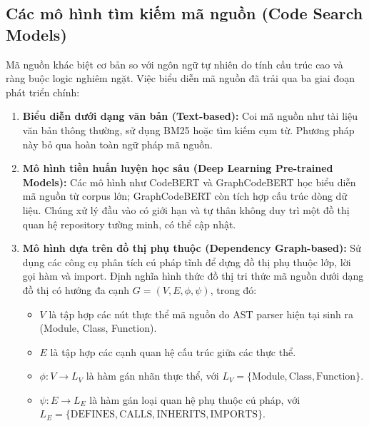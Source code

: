 \documentclass[12pt,a4paper,oneside]{report}
\begin{document}
\subsection{Các mô hình tìm kiếm mã nguồn (Code Search Models)}
Mã nguồn khác biệt cơ bản so với ngôn ngữ tự nhiên do tính cấu trúc cao và ràng buộc logic nghiêm ngặt. Việc biểu diễn mã nguồn đã trải qua ba giai đoạn phát triển chính:
\begin{enumerate}
    \item \textbf{Biểu diễn dưới dạng văn bản (Text-based):} Coi mã nguồn như tài liệu văn bản thông thường, sử dụng BM25 hoặc tìm kiếm cụm từ. Phương pháp này bỏ qua hoàn toàn ngữ pháp mã nguồn.
    \item \textbf{Mô hình tiền huấn luyện học sâu (Deep Learning Pre-trained Models):} Các mô hình như CodeBERT \cite{feng2020codebert} và GraphCodeBERT \cite{guo2024graphcodebert} học biểu diễn mã nguồn từ corpus lớn; GraphCodeBERT còn tích hợp cấu trúc dòng dữ liệu. Chúng xử lý đầu vào có giới hạn và tự thân không duy trì một đồ thị quan hệ repository tường minh, có thể cập nhật.
    \item \textbf{Mô hình dựa trên đồ thị phụ thuộc (Dependency Graph-based):} Sử dụng các công cụ phân tích cú pháp tĩnh để dựng đồ thị phụ thuộc lớp, lời gọi hàm và import. Định nghĩa hình thức đồ thị tri thức mã nguồn dưới dạng đồ thị có hướng đa cạnh $G = (V, E, \phi, \psi)$, trong đó:
    \begin{itemize}
        \item $V$ là tập hợp các nút thực thể mã nguồn do AST parser hiện tại sinh ra (Module, Class, Function).
        \item $E$ là tập hợp các cạnh quan hệ cấu trúc giữa các thực thể.
        \item $\phi: V \rightarrow L_V$ là hàm gán nhãn thực thể, với $L_V = \{\text{Module}, \text{Class}, \text{Function}\}$.
        \item $\psi: E \rightarrow L_E$ là hàm gán loại quan hệ phụ thuộc cú pháp, với $L_E = \{\text{DEFINES}, \text{CALLS}, \text{INHERITS}, \text{IMPORTS}\}$.
    \end{itemize}
\end{enumerate}
\end{document}
